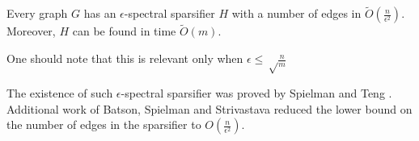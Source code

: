 \begin{theorem}
    Every graph $G$ has an $\epsilon$-spectral sparsifier $H$ with a number of
    edges in $\tilde{O}(\frac{n}{\epsilon^2})$. Moreover, $H$ can be found in
    time $\tilde{O}(m)$.
\end{theorem}
One should note that this is relevant only when $\epsilon \leq \sqrt\frac{n}{m}$

The existence of such $\epsilon$-spectral sparsifier was proved by Spielman and
Teng \cite{spielman_spectral_2011}. Additional work of Batson, Spielman
and Strivastava \cite{batson_twice-ramanujan_2012} reduced the lower bound on the
number of edges in the sparsifier to $O(\frac{n}{\epsilon ^2})$.



